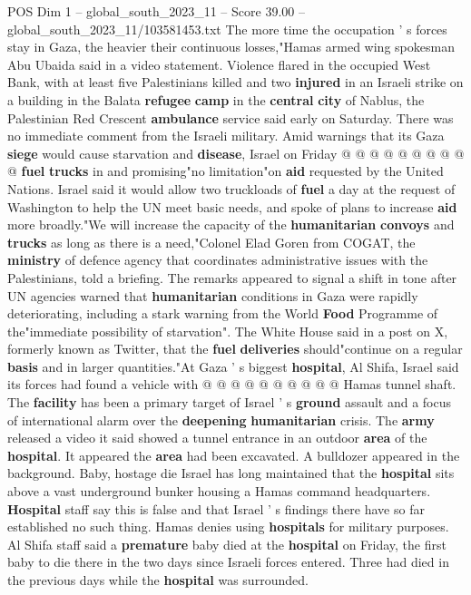 \begin{textsample}{POS Dim 1 – global\_south\_2023\_11 – Score 39.00 – global\_south\_2023\_11/103581453.txt}
The more time the occupation ' s forces stay in Gaza, the heavier their continuous losses,"Hamas armed wing spokesman Abu Ubaida said in a video statement.
Violence flared in the occupied West Bank, with at least five Palestinians killed and two \textbf{injured} in an Israeli strike on a building in the Balata \textbf{refugee} \textbf{camp} in the \textbf{central} \textbf{city} of Nablus, the Palestinian Red Crescent \textbf{ambulance} service said early on Saturday.
There was no immediate comment from the Israeli military.
Amid warnings that its Gaza \textbf{siege} would cause starvation and \textbf{disease}, Israel on Friday @ @ @ @ @ @ @ @ @ @ \textbf{fuel} \textbf{trucks} in and promising"no limitation"on \textbf{aid} requested by the United Nations.
Israel said it would allow two truckloads of \textbf{fuel} a day at the request of Washington to help the UN meet basic needs, and spoke of plans to increase \textbf{aid} more broadly."We will increase the capacity of the \textbf{humanitarian} \textbf{convoys} and \textbf{trucks} as long as there is a need,"Colonel Elad Goren from COGAT, the \textbf{ministry} of defence agency that coordinates administrative issues with the Palestinians, told a briefing.
The remarks appeared to signal a shift in tone after UN agencies warned that \textbf{humanitarian} conditions in Gaza were rapidly deteriorating, including a stark warning from the World \textbf{Food} Programme of the"immediate possibility of starvation".
The White House said in a post on X, formerly known as Twitter, that the \textbf{fuel} \textbf{deliveries} should"continue on a regular \textbf{basis} and in larger quantities."At Gaza ' s biggest \textbf{hospital}, Al Shifa, Israel said its forces had found a vehicle with @ @ @ @ @ @ @ @ @ @ Hamas tunnel shaft.
The \textbf{facility} has been a primary target of Israel ' s \textbf{ground} assault and a focus of international alarm over the \textbf{deepening} \textbf{humanitarian} crisis.
The \textbf{army} released a video it said showed a tunnel entrance in an outdoor \textbf{area} of the \textbf{hospital}.
It appeared the \textbf{area} had been excavated.
A bulldozer appeared in the background.
Baby, hostage die Israel has long maintained that the \textbf{hospital} sits above a vast underground bunker housing a Hamas command headquarters. \textbf{Hospital} staff say this is false and that Israel ' s findings there have so far established no such thing.
Hamas denies using \textbf{hospitals} for military purposes.
Al Shifa staff said a \textbf{premature} baby died at the \textbf{hospital} on Friday, the first baby to die there in the two days since Israeli forces entered.
Three had died in the previous days while the \textbf{hospital} was surrounded.

\end{textsample}
